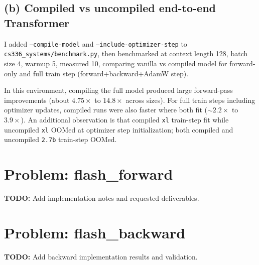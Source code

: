 \documentclass[11pt]{article}
\begin{document}
\subsection*{(b) Compiled vs uncompiled end-to-end Transformer}
I added \texttt{--compile-model} and \texttt{--include-optimizer-step} to \texttt{cs336\_systems/benchmark.py}, then benchmarked at context length 128, batch size 4, warmup 5, measured 10, comparing vanilla vs compiled model for forward-only and full train step (forward+backward+AdamW step).

\begin{table}[h]
\centering
{}
\caption{End-to-end Transformer benchmark: vanilla vs \texttt{torch.compile} (A100 40GB, FP32).}
\end{table}

In this environment, compiling the full model produced large forward-pass improvements (about \(4.75\times\) to \(14.8\times\) across sizes). For full train steps including optimizer updates, compiled runs were also faster where both fit (\(\sim 2.2\times\) to \(3.9\times\)). An additional observation is that compiled \texttt{xl} train-step fit while uncompiled \texttt{xl} OOMed at optimizer step initialization; both compiled and uncompiled \texttt{2.7b} train-step OOMed.

\section{Problem: flash\_forward}
\textbf{TODO:} Add implementation notes and requested deliverables.

\section{Problem: flash\_backward}
\textbf{TODO:} Add backward implementation results and validation.
\end{document}
